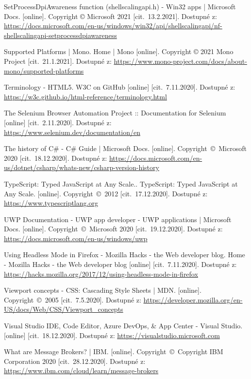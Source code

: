 \begin{thebibliography}{99}
 SetProcessDpiAwareness function (shellscalingapi.h) - Win32 apps | Microsoft Docs. [online]. Copyright © Microsoft 2021 [cit.~13.2.2021]. Dostupné z: \url{https://docs.microsoft.com/en-us/windows/win32/api/shellscalingapi/nf-shellscalingapi-setprocessdpiawareness}

 Supported Platforms | Mono. Home | Mono [online]. Copyright © 2021 Mono Project [cit.~21.1.2021]. Dostupné z: \url{https://www.mono-project.com/docs/about-mono/supported-platforms}

 Terminology - HTML5. W3C on GitHub [online] [cit.~7.11.2020]. Dostupné z: \url{https://w3c.github.io/html-reference/terminology.html}

 The Selenium Browser Automation Project :: Documentation for Selenium [online] [cit.~2.11.2020]. Dostupné z: \url{https://www.selenium.dev/documentation/en}

 The history of C\# - C\# Guide | Microsoft Docs. [online]. Copyright~©~Microsoft 2020 [cit.~18.12.2020]. Dostupné z: \url{https://docs.microsoft.com/en-us/dotnet/csharp/whats-new/csharp-version-history}

 TypeScript: Typed JavaScript at Any Scale.. TypeScript: Typed JavaScript at Any Scale. [online]. Copyright~©~2012 [cit.~17.12.2020]. Dostupné z: \url{https://www.typescriptlang.org}

 UWP Documentation - UWP app developer - UWP applications | Microsoft Docs. [online]. Copyright~©~Microsoft 2020 [cit.~19.12.2020]. Dostupné z: \url{https://docs.microsoft.com/en-us/windows/uwp}

 Using Headless Mode in Firefox - Mozilla Hacks - the Web developer blog. Home - Mozilla Hacks - the Web developer blog [online] [cit.~7.11.2020]. Dostupné z: \url{https://hacks.mozilla.org/2017/12/using-headless-mode-in-firefox}

 Viewport concepts - CSS: Cascading Style Sheets | MDN. [online]. Copyright~©~2005 [cit.~7.5.2020]. Dostupné z: \url{https://developer.mozilla.org/en-US/docs/Web/CSS/Viewport_concepts}

 Visual Studio IDE, Code Editor, Azure DevOps, \& App Center - Visual Studio. [online] [cit.~18.12.2020]. Dostupné z: \url{https://visualstudio.microsoft.com}

 What are Message Brokers? | IBM. [online]. Copyright~©~Copyright IBM Corporation 2020 [cit.~28.12.2020]. Dostupné z: \url{https://www.ibm.com/cloud/learn/message-brokers}


\end{thebibliography}

